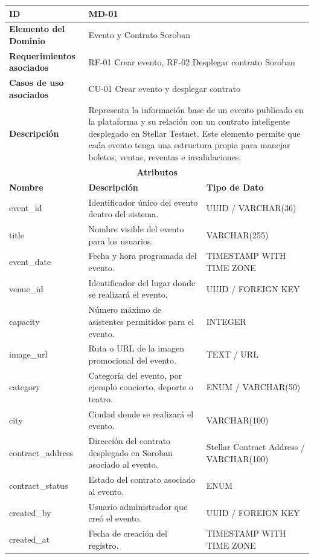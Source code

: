 \documentclass[12pt,letterpaper]{article}
\begin{document}
\begin{table}[H]
\centering
\scriptsize
\renewcommand{\arraystretch}{1.12}
\setlength{\tabcolsep}{4pt}

\begin{tabularx}{\textwidth}{|p{3.2cm}|X|p{3.5cm}|}
\hline
\textbf{ID} & MD-01 & \\ \hline

\textbf{Elemento del Dominio} & 
\multicolumn{2}{X|}{Evento y Contrato Soroban} \\ \hline

\textbf{Requerimientos asociados} & 
\multicolumn{2}{X|}{RF-01 Crear evento, RF-02 Desplegar contrato Soroban} \\ \hline

\textbf{Casos de uso asociados} & 
\multicolumn{2}{X|}{CU-01 Crear evento y desplegar contrato} \\ \hline

\textbf{Descripción} & 
\multicolumn{2}{X|}{Representa la información base de un evento publicado en la plataforma y su relación con un contrato inteligente desplegado en Stellar Testnet. Este elemento permite que cada evento tenga una estructura propia para manejar boletos, ventas, reventas e invalidaciones.} \\ \hline

\multicolumn{3}{|c|}{\textbf{Atributos}} \\ \hline

\textbf{Nombre} & \textbf{Descripción} & \textbf{Tipo de Dato} \\ \hline

event\_id & Identificador único del evento dentro del sistema. & UUID / VARCHAR(36) \\ \hline
title & Nombre visible del evento para los usuarios. & VARCHAR(255) \\ \hline
event\_date & Fecha y hora programada del evento. & TIMESTAMP WITH TIME ZONE \\ \hline
venue\_id & Identificador del lugar donde se realizará el evento. & UUID / FOREIGN KEY \\ \hline
capacity & Número máximo de asistentes permitidos para el evento. & INTEGER \\ \hline
image\_url & Ruta o URL de la imagen promocional del evento. & TEXT / URL \\ \hline
category & Categoría del evento, por ejemplo concierto, deporte o teatro. & ENUM / VARCHAR(50) \\ \hline
city & Ciudad donde se realizará el evento. & VARCHAR(100) \\ \hline
contract\_address & Dirección del contrato desplegado en Soroban asociado al evento. & Stellar Contract Address / VARCHAR(100) \\ \hline
contract\_status & Estado del contrato asociado al evento. & ENUM \\ \hline
created\_by & Usuario administrador que creó el evento. & UUID / FOREIGN KEY \\ \hline
created\_at & Fecha de creación del registro. & TIMESTAMP WITH TIME ZONE \\ \hline


\end{tabularx}
\end{table}
\end{document}
